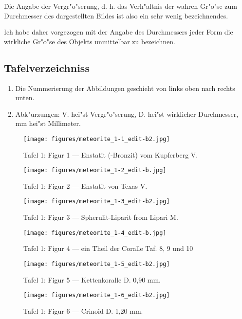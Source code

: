 \documentclass[a4paper, 11pt, oneside]{article}
\begin{document}
Die Angabe der Vergr"o"serung, d. h. das Verh"altnis der wahren Gr"o"se zum Durchmesser des dargestellten Bildes ist also ein sehr wenig bezeichnendes.

Ich habe daher vorgezogen mit der Angabe des Durchmessers jeder Form die wirkliche Gr"o"se des Objekts unmittelbar zu bezeichnen.
\clearpage
\subsection{Tafelverzeichniss}
\begin{enumerate}
    \item Die Nummerierung der Abbildungen geschieht von links oben nach rechts unten.
    \item Abk"urzungen: V. hei"st Vergr"o"serung, D. hei"st wirklicher Durchmesser, mm hei"st Millimeter.
\end{enumerate}
\clearpage
\pagestyle{fancy}
\fancyhf{}
\cfoot{\thepage}
\begin{figure}[b]
\texttt{[image: figures/meteorite\_1-1\_edit-b2.jpg]}
\caption{Tafel 1: Figur 1 --- Enstatit (-Bronzit) vom Kupferberg V.}
\centering
\end{figure}
\clearpage
\begin{figure}[t]
\texttt{[image: figures/meteorite\_1-2\_edit-b.jpg]}
\caption{Tafel 1: Figur 2 --- Enstatit von Texas V.}
\centering
\end{figure}
\clearpage
\begin{figure}[t]
\texttt{[image: figures/meteorite\_1-3\_edit-b2.jpg]}
\caption{Tafel 1: Figur 3 --- Spherulit-Liparit from Lipari M.}
\centering
\end{figure}
\clearpage
\begin{figure}[t]
\texttt{[image: figures/meteorite\_1-4\_edit-b.jpg]}
\caption{Tafel 1: Figur 4 --- ein Theil der Coralle Taf. 8, 9 und 10}
\centering
\end{figure}
\clearpage
\begin{figure}[t]
\texttt{[image: figures/meteorite\_1-5\_edit-b2.jpg]}
\caption{Tafel 1: Figur 5 --- Kettenkoralle D. 0,90 mm.}
\centering
\end{figure}
\clearpage
\begin{figure}[t]
\texttt{[image: figures/meteorite\_1-6\_edit-b2.jpg]}
\caption{Tafel 1: Figur 6 --- Crinoid D. 1,20 mm.}
\centering
\end{figure}
\end{document}
